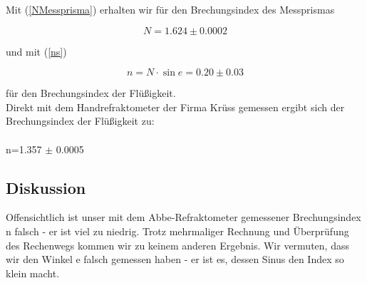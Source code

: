 \documentclass{article}
\begin{document}
Mit (\ref{NMessprisma}) erhalten wir für den Brechungsindex des Messprismas

$$ N = 1.624 \pm 0.0002 $$

und mit (\ref{ns}) 


$$ n = N \cdot \sin e = 0.20 \pm 0.03 $$

für den Brechungsindex der Flüßigkeit. \\

Direkt mit dem Handrefraktometer der Firma Krüss gemessen ergibt sich der Brechungsindex der Flüßigkeit zu:\\
\\n=1.357 $\pm$ 0.0005\\
\subsection{Diskussion}
Offensichtlich ist unser mit dem Abbe-Refraktometer gemessener Brechungsindex n falsch - er ist viel zu niedrig. Trotz mehrmaliger Rechnung und Überprüfung des Rechenwegs kommen wir zu keinem anderen Ergebnis. Wir vermuten, dass wir den Winkel e falsch gemessen haben - er ist es, dessen Sinus den Index so klein macht. 
\end{document}
